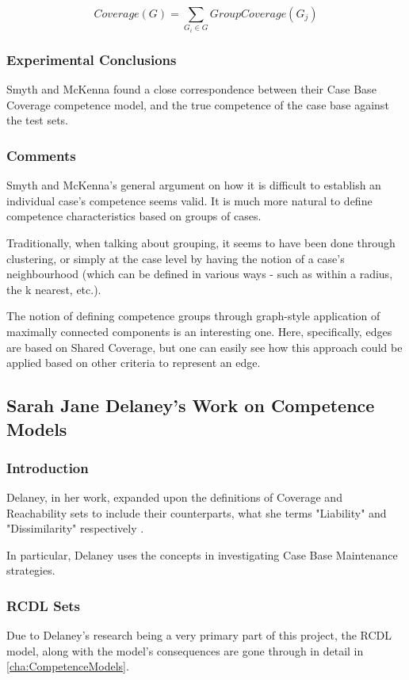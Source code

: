 \documentclass[a4paper,11pt]{report}
\begin{document}
\[
Coverage(G)=\underset{G_{i}\in G}{\sum}GroupCoverage(G_{j})
\]

\subsubsection{Experimental Conclusions}
Smyth and McKenna found a close correspondence between their Case Base Coverage competence model, and the true competence of the case base against the test sets\cite{Smyth1998}.

\subsubsection{Comments}
Smyth and McKenna's general argument on how it is difficult to establish an individual case's competence seems valid. It is much more natural to define competence characteristics based on groups of cases. 

Traditionally, when talking about grouping, it seems to have been done through clustering, or simply at the case level by having the notion of a case's neighbourhood (which can be defined in various ways - such as within a radius, the k nearest, etc.).

The notion of defining competence groups through graph-style application of maximally connected components is an interesting one. Here, specifically, edges are based on Shared Coverage, but one can easily see how this approach could be applied based on other criteria to represent an edge.

\subsection{Sarah Jane Delaney's Work on Competence Models\label{sec:DelaneysWork}}
\subsubsection{Introduction}
Delaney, in her work, expanded upon the definitions of Coverage and Reachability sets to include their counterparts, what she terms "Liability" and "Dissimilarity" respectively \cite{Delany2009}. 

In particular, Delaney uses the concepts in investigating Case Base Maintenance strategies.

\subsubsection{RCDL Sets}
Due to Delaney's research being a very primary part of this project, the RCDL model, along with the model's consequences are gone through in detail in \ref{cha:CompetenceModels}. 
\end{document}
